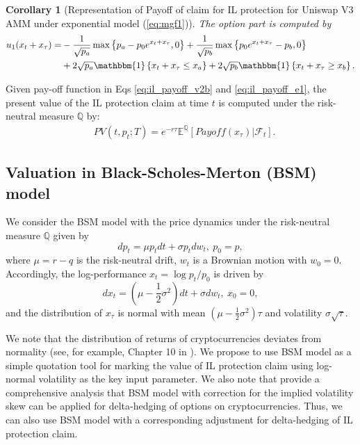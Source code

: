 \documentclass[pdftex,11pt,a4paper] {article}
\newtheorem{corollary}{Corollary}[section]
\begin{document}
\begin{corollary}[Representation of Payoff of claim for IL protection for Uniswap V3 AMM under exponential model (\protect\ref{eq:mgf1})]
The option part is computed by
\begin{equation}  \label{eq:mgf2}
\begin{split}
u_{1}(x_{t}+x_{\tau}) = & -\frac{1}{\sqrt{p_{a}}}\max\left\{
p_{a}-p_{0}e^{x_{t}+x_{\tau}}, 0\right\} +\frac{1}{\sqrt{p_{b}}} \max\left\{
p_{0}e^{x_{t}+x_{\tau}}-p_{b}, 0 \right\} \\
& +2\sqrt{p_{a}} \mathbbm{1}\left\{x_{t}+x_{\tau}\leq x_{a}\right\} +2\sqrt{%
p_{b}}\mathbbm{1}\left\{x_{t}+x_{\tau} \geq x_{b}\right\}.
\end{split}%
\end{equation}
\end{corollary}

Given pay-off function in Eqs \eqref{eq:il_payoff_v2b} and %
\eqref{eq:il_payoff_e1}, the present value of the IL protection claim at
time $t$ is computed under the risk-neutral measure $\mathbb{Q}$ by:
\begin{equation}  \label{eq:mgf4}
\begin{split}
& PV(t,p_{t};T) = e^{-r \tau}\mathbb{E}^{\mathbb{Q}}[Payoff
(x_{\tau})\left.\right|\mathcal{F}_{t}].
\end{split}%
\end{equation}

\subsection{Valuation in Black-Scholes-Merton (BSM) model}

We consider the BSM model with the price dynamics under the risk-neutral
measure $\mathbb{Q}$ given by
\begin{equation}  \label{eq:bs1}
dp_{t} = \mu p_{t} dt + \sigma p_{t} dw_{t}, \ p_0 = p,
\end{equation}
where $\mu=r-q$ is the risk-neutral drift, $w_{t}$ is a Brownian motion with
$w_{0}=0$. Accordingly, the log-performance $x_t=\log p_t / p_0$ is driven
by
\begin{equation}  \label{eq:bs2}
dx_{t} = \left(\mu-\frac{1}{2}\sigma^{2}\right) dt + \sigma dw_{t}, \ x_0 = 0,
\end{equation}
and the distribution of $x_{\tau}$ is normal with mean $\left(\mu-\frac{1}{2}%
\sigma^{2}\right) \tau$ and volatility $\sigma \sqrt{\tau}$.


We note that the distribution of returns of cryptocurrencies deviates from normality (see, for example, Chapter 10 in \citet{LiptonTreccani2021}). We propose to use BSM model as a simple quotation tool for marking the value of IL protection claim using log-normal volatility as the key input parameter. We also note that \citet{Alexander2023a} provide a comprehensive analysis that BSM model with correction for the implied volatility skew can be applied for delta-hedging of options on cryptocurrencies. Thus, we can also use BSM model with a corresponding adjustment for delta-hedging of IL protection claim.
\end{document}
